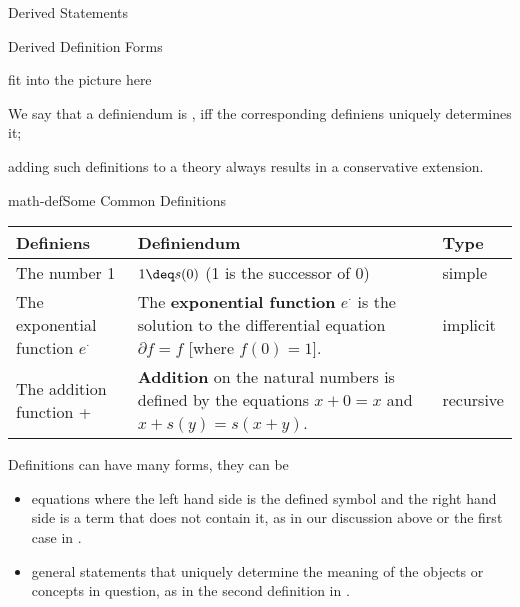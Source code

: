 
\begin{omgroup}{Derived Statements}

\begin{module}[id=derived-defs]
\begin{omgroup}[short=Derived Definitions]{Derived Definition Forms}

\begin{oldpart}{fit into the picture here}
\begin{definition}[display=flow,id=well-defined.def]
  We say that a definiendum is , iff the corresponding definiens
  uniquely determines it;
\end{definition}
adding such definitions to a theory always results in a conservative extension.

\begin{myfig}{math-def}{Some Common Definitions}\small
 \begin{tabular}{|p{2.2cm}|p{7cm}|l|}\hline
   Definiens & Definiendum & Type \\\hline\hline
   The number 1 & $1\deq s(0)$ (1 is the successor of 0) & simple\\\hline
   The exponential function $e^\cdot$ 
         &  The {\textbf{exponential function}} $e^\cdot$ is the solution to the
   differential equation $\partial f=f$ [where $f(0)=1$]. & implicit\\\hline
   The addition function + & {\textbf{Addition}} on the natural numbers is defined by the equations
   $x+0=x$ and $x+s(y)=s(x+y)$. & recursive\\\hline
 \end{tabular}
\end{myfig}

\begin{omtext}
  Definitions can have many forms, they can be
\begin{itemize}
\item equations where the left hand side is the defined symbol and the right hand side is
  a term that does not contain it, as in our discussion above or the first case in
  {}. 
\item general statements that uniquely determine the meaning of the objects or concepts in
  question, as in the second definition in {}. 
  

\end{itemize}
\end{omtext}
\end{oldpart}
\end{omgroup}
\end{module}
\end{omgroup}
